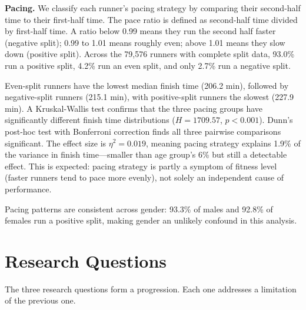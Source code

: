 \documentclass[conference]{IEEEtran}
\begin{document}
\textbf{Pacing.} We classify each runner's pacing strategy by comparing their second-half time to their first-half time. The pace ratio is defined as second-half time divided by first-half time. A ratio below 0.99 means they run the second half faster (negative split); 0.99 to 1.01 means roughly even; above 1.01 means they slow down (positive split). Across the 79,576 runners with complete split data, 93.0\% run a positive split, 4.2\% run an even split, and only 2.7\% run a negative split.

Even-split runners have the lowest median finish time (206.2 min), followed by negative-split runners (215.1 min), with positive-split runners the slowest (227.9 min). A Kruskal-Wallis test confirms that the three pacing groups have significantly different finish time distributions ($H = 1709.57$, $p < 0.001$). Dunn's post-hoc test with Bonferroni correction finds all three pairwise comparisons significant. The effect size is $\eta^2 = 0.019$, meaning pacing strategy explains 1.9\% of the variance in finish time---smaller than age group's 6\% but still a detectable effect. This is expected: pacing strategy is partly a symptom of fitness level (faster runners tend to pace more evenly), not solely an independent cause of performance.

Pacing patterns are consistent across gender: 93.3\% of males and 92.8\% of females run a positive split, making gender an unlikely confound in this analysis.

\section{Research Questions}

The three research questions form a progression. Each one addresses a limitation of the previous one.
\end{document}
